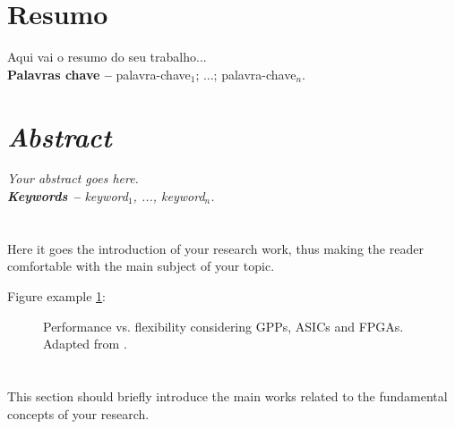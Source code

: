 \documentclass[12pt, a4paper]{article}
\begin{document}
\makeourtitle

\tableofcontents

\newpage
\section*{Resumo}
\label{sec:resumo}
Aqui vai o resumo do seu trabalho...\\%


\textbf{Palavras chave --} palavra-chave$_1$; ...; palavra-chave$_n$.


\newpage
\section*{\textit{Abstract}}
\label{sec:abstract}
\textit{
  Your abstract goes here.
}\\%

\textit{\textbf{Keywords --} keyword$_1$, ..., keyword$_n$.}


\newpage
\section{\sectionI}
\label{sec:introducao}
Here it goes the introduction of your research work, thus making the reader comfortable with the main subject of your topic.

Figure example \ref{fig:perf_flex}:

\begin{figure}[ht]
	\centering
	\caption{Performance vs. flexibility considering GPPs, ASICs and FPGAs.
	  Adapted from \cite{Bobda2007a}.}
	\label{fig:perf_flex}
\end{figure}


\section{\sectionII}
\label{sec:trabalhos-relacionados}
This section should briefly introduce the main works related to the fundamental concepts of your research.
\end{document}
